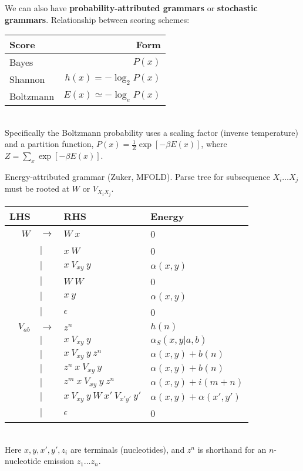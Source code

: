\documentclass{beamer}
\begin{document}
\begin{frame}{}
We can also have {\bf probability-attributed grammars} or {\bf stochastic grammars}.
Relationship between scoring schemes:
\\
\begin{tabular}{l|r}
Score & Form \\
\hline
Bayes     & $P(x)$ \\
Shannon   & $h(x) = -\log_2 P(x)$ \\
Boltzmann & $E(x) \simeq -\log_e P(x)$
\end{tabular}
\\
Specifically the Boltzmann probability uses a scaling factor (inverse temperature) and a partition function,
$P(x) = \frac{1}{Z} \exp[-\beta E(x)]$,
where $Z = \sum_x \exp[-\beta E(x)]$.
\end{frame}
\begin{frame}{}
Energy-attributed grammar (Zuker, MFOLD).
Parse tree for subsequence $X_i \ldots X_j$ must be rooted at $W$ or $V_{X_i X_j}$.
\\
\tiny
\begin{tabular}{rll|l}
LHS & & RHS & Energy \\
\hline
$W$ & $\to$ & $W\ x$         & 0 \\
    &   $|$ & $x\ W$         & 0 \\
    &   $|$ & $x\ V_{xy}\ y$ & $\alpha(x,y)$ \\
    &   $|$ & $W\ W$         & 0 \\
    &   $|$ & $x\ y$         & $\alpha(x,y)$ \\
    &   $|$ & $\epsilon$     & 0 \\
$V_{ab}$ & $\to$ & $z^n$                               & $h(n)$ \\
         &   $|$ & $x\ V_{xy}\ y$                      & $\alpha_S(x,y|a,b)$ \\
         &   $|$ & $x\ V_{xy}\ y\ z^n$                 & $\alpha(x,y) + b(n)$ \\
         &   $|$ & $z^n\ x\ V_{xy}\ y$                 & $\alpha(x,y) + b(n)$ \\
         &   $|$ & $z^m\ x\ V_{xy}\ y\ z^n$            & $\alpha(x,y) + i(m+n)$ \\
         &   $|$ & $x\ V_{xy}\ y\ W\ x'\ V_{x'y'}\ y'$ & $\alpha(x,y) + \alpha(x',y')$ \\
         &   $|$ & $\epsilon$                          & 0
\end{tabular}
\normalsize
\\
Here $x,y,x',y',z_i$ are terminals (nucleotides), and $z^n$ is shorthand for an $n$-nucleotide emission $z_1 \ldots z_n$.
\end{frame}
\end{document}
